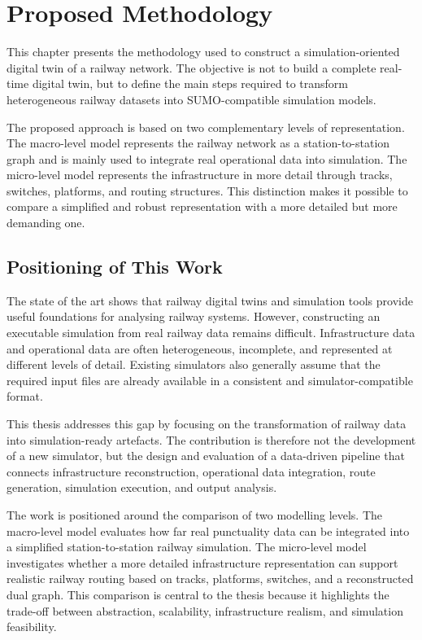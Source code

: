 \chapter{Proposed Methodology}\label{chap:methodology}
This chapter presents the methodology used to construct a simulation-oriented digital twin of a railway network. The 
objective is not to build a complete real-time digital twin, but to define the main steps required to transform 
heterogeneous railway datasets into SUMO-compatible simulation models.

The proposed approach is based on two complementary levels of representation. The macro-level model represents the 
railway network as a station-to-station graph and is mainly used to integrate real operational data into simulation. The 
micro-level model represents the infrastructure in more detail through tracks, switches, platforms, and routing structures. 
This distinction makes it possible to compare a simplified and robust representation with a more detailed but more 
demanding one.

\section{Positioning of This Work}
The state of the art shows that railway digital twins and simulation tools provide useful foundations for analysing 
railway systems. However, constructing an executable simulation from real railway data remains difficult. Infrastructure 
data and operational data are often heterogeneous, incomplete, and represented at different levels of detail. Existing 
simulators also generally assume that the required input files are already available in a consistent and 
simulator-compatible format.

This thesis addresses this gap by focusing on the transformation of railway data into simulation-ready artefacts. The 
contribution is therefore not the development of a new simulator, but the design and evaluation of a data-driven pipeline 
that connects infrastructure reconstruction, operational data integration, route generation, simulation execution, and 
output analysis.

The work is positioned around the comparison of two modelling levels. The macro-level model evaluates how far real 
punctuality data can be integrated into a simplified station-to-station railway simulation. The micro-level model 
investigates whether a more detailed infrastructure representation can support realistic railway routing based on tracks, 
platforms, switches, and a reconstructed dual graph. This comparison is central to the thesis because it highlights the 
trade-off between abstraction, scalability, infrastructure realism, and simulation feasibility.


